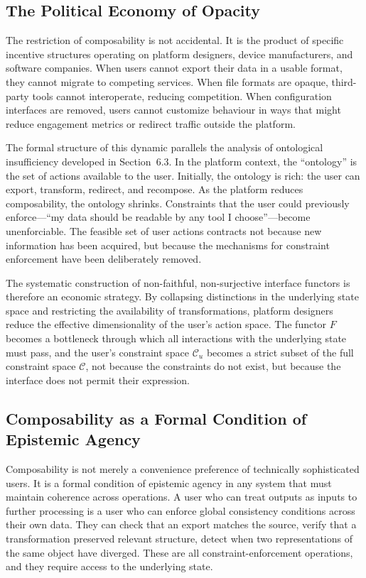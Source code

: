 \documentclass[12pt, oneside]{article}
\begin{document}
\subsection{The Political Economy of Opacity}

The restriction of composability is not accidental. It is the product of specific incentive structures operating on platform designers, device manufacturers, and software companies. When users cannot export their data in a usable format, they cannot migrate to competing services. When file formats are opaque, third-party tools cannot interoperate, reducing competition. When configuration interfaces are removed, users cannot customize behaviour in ways that might reduce engagement metrics or redirect traffic outside the platform.

The formal structure of this dynamic parallels the analysis of ontological insufficiency developed in Section~6.3. In the platform context, the ``ontology'' is the set of actions available to the user. Initially, the ontology is rich: the user can export, transform, redirect, and recompose. As the platform reduces composability, the ontology shrinks. Constraints that the user could previously enforce---``my data should be readable by any tool I choose''---become unenforciable. The feasible set of user actions contracts not because new information has been acquired, but because the mechanisms for constraint enforcement have been deliberately removed.

The systematic construction of non-faithful, non-surjective interface functors is therefore an economic strategy. By collapsing distinctions in the underlying state space and restricting the availability of transformations, platform designers reduce the effective dimensionality of the user's action space. The functor $F$ becomes a bottleneck through which all interactions with the underlying state must pass, and the user's constraint space $\mathcal{C}_u$ becomes a strict subset of the full constraint space $\mathcal{C}$, not because the constraints do not exist, but because the interface does not permit their expression.

\subsection{Composability as a Formal Condition of Epistemic Agency}

Composability is not merely a convenience preference of technically sophisticated users. It is a formal condition of epistemic agency in any system that must maintain coherence across operations. A user who can treat outputs as inputs to further processing is a user who can enforce global consistency conditions across their own data. They can check that an export matches the source, verify that a transformation preserved relevant structure, detect when two representations of the same object have diverged. These are all constraint-enforcement operations, and they require access to the underlying state.
\end{document}
